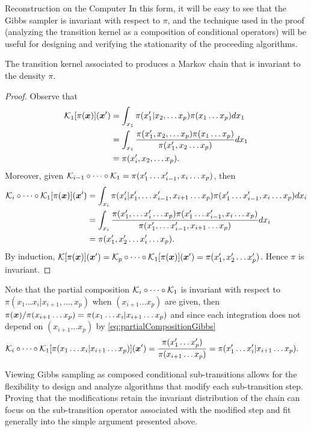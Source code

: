 \begin{chapter}{Reconstruction on the Computer}
In this form, it will be easy to see that the Gibbs sampler is invariant with respect to $\pi$, and the technique used in the proof (analyzing the transition kernel as a composition of conditional operators) will be useful for designing and verifying the stationarity of the proceeding algorithms.
\begin{prop} The transition kernel associated to  produces a Markov chain that is invariant to the density $\pi$.
\end{prop}
\begin{proof}
  Observe that
  \begin{align}
    \mathcal K_1[\pi(\mbox{\boldmath$x$})](\mbox{\boldmath$x$}') 
      &=\int_{x_1} \pi(x_1'|x_2,\dots x_p) \pi(x_1\dots x_p)dx_1\nonumber\\
      &=\int_{x_1} \frac{\pi(x_1',x_2,\dots x_p) \pi(x_1\dots x_p)}{\pi(x_1',x_2\dots x_p)}dx_1\nonumber\\
      &=\pi(x_i',x_2,\dots x_p).
  \end{align}
  Moreover, given $\mathcal K_{i-1} \circ\dots \circ \mathcal K_1 = \pi(x_1'\dots x_{i-1}',x_i\dots x_p)$, then
  \begin{align}
    \mathcal K_i \circ\dots \circ \mathcal K_1[\pi(\mbox{\boldmath$x$})](\mbox{\boldmath$x$}') 
      &=\int_{x_i} \pi(x_i'|x_1',\dots x_{i-1}',x_{i+1}\dots x_p) \pi(x_1'\dots x_{i-1}',x_i\dots x_p)dx_i\nonumber\\
      &=\int_{x_i} \frac{\pi(x_1',\dots x_{i}'\dots x_p) \pi(x_1'\dots x_{i-1}',x_i\dots x_p)}{\pi(x_1',\dots x_{i-1}',x_{i+1}\dots x_p)}dx_i\nonumber\\
      &=\pi(x_1',x_2' \dots x_i'\dots x_p).\label{eq:partialCompositionGibbs}
  \end{align}
  By induction, $\mathcal K [\pi(\mbox{\boldmath$x$})](\mbox{\boldmath$x$}') = \mathcal K_p\circ\dots\circ \mathcal K_1 [\pi(\mbox{\boldmath$x$})](\mbox{\boldmath$x$}') = \pi(x_1',x_2'\dots x_p')$.
  Hence $\pi$ is invariant.
\end{proof}
Note that the partial composition $\mathcal K_i\circ\dots\circ\mathcal K_1$ is invariant with respect to $\pi(x_1\dots x_i|x_{i+1},\dots,x_p)$ when $(x_{i+1}\dots x_p)$ are given, then $\pi(\mbox{\boldmath$x$})/\pi(x_{i+1}\dots x_p)= \pi(x_1\dots x_{i}|x_{i+1}\dots x_p)$ and since each integration does not depend on $(x_{i+1}\dots x_p)$ by \eqref{eq:partialCompositionGibbs}
\begin{align}
  \mathcal K_i\circ\dots\circ \mathcal K_1 [\pi(x_1\dots x_i|x_{i+1}\dots x_p)](\mbox{\boldmath$x$}') 
  &= \frac{\pi(x_1'\dots x_p')}{\pi(x_{i+1}\dots x_p)} = \pi(x_1'\dots x_i'|x_{i+1}\dots x_p).
\end{align}

Viewing Gibbs sampling as composed conditional sub-transitions allows for the flexibility to design and analyze algorithms that modify each sub-transition step. 
Proving that the modifications retain the invariant distribution of the chain can focus on the sub-transition operator associated with the modified step and fit generally into the simple argument presented above. 


\end{chapter}

